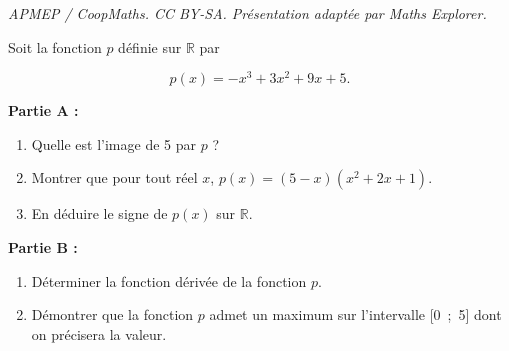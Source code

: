 \documentclass[10pt]{article}
\providecommand{\R}{\mathbb{R}}
\begin{document}
\noindent\textit{APMEP / CoopMaths. CC BY-SA. Présentation adaptée par Maths Explorer.}\par\medskip
\medskip

Soit la fonction $p$ définie sur $\R$ par 

\[p(x) = -x^3 +3x^2 + 9x + 5.\]

\smallskip

\textbf{Partie A :}

\medskip

\begin{enumerate}
\item Quelle est l'image de 5 par $p$ ?
\item Montrer que pour tout réel $x$,\: $p(x) = (5- x)\left(x^2 + 2x + 1\right)$.
\item En déduire le signe de $p(x)$ sur $\R$.
\end{enumerate}

\bigskip

\textbf{Partie B :}

\medskip

\begin{enumerate}
\item Déterminer la fonction dérivée de la fonction $p$.
\item Démontrer que la fonction $p$ admet un maximum sur l'intervalle [0~;~5] dont on
précisera la valeur.
\end{enumerate}

\bigskip
\end{document}
